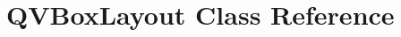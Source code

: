 \hypertarget{classGUI_1_1QtGui_1_1QVBoxLayout}{}\section{Q\+V\+Box\+Layout Class Reference}
\label{classGUI_1_1QtGui_1_1QVBoxLayout}
